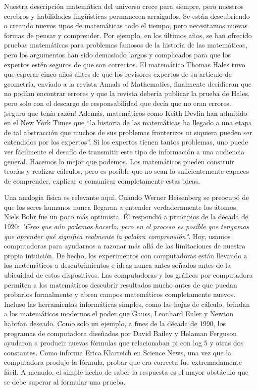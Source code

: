 \documentclass{article}
\begin{document}
Nuestra descripción matemática del universo crece para siempre, pero nuestros
cerebros y habilidades lingüísticas permanecen arraigados. Se están descubriendo
o creando nuevos tipos de matemáticas todo el tiempo, pero necesitamos nuevas
formas de pensar y comprender. Por ejemplo, en los últimos años, se han ofrecido
pruebas matemáticas para problemas famosos de la historia de las matemáticas,
pero los argumentos han sido demasiado largos y complicados para que los
expertos estén seguros de que son correctos. El matemático Thomas Hales tuvo que
esperar cinco años antes de que los revisores expertos de su artículo de
geometría, enviado a la revista Annals of Mathematics, finalmente decidieran que
no podían encontrar errores y que la revista debería publicar la prueba de
Hales, pero solo con el descargo de responsabilidad que decía que no eran
errores. ¡seguro que tenía razón! Además, matemáticos como Keith Devlin han
admitido en el New York Times que “la historia de las matemáticas ha llegado a
una etapa de tal abstracción que muchos de sus problemas fronterizos ni siquiera
pueden ser entendidos por los expertos”. Si los expertos tienen tantos
problemas, uno puede ver fácilmente el desafío de transmitir este tipo de
información a una audiencia general. Hacemos lo mejor que podemos. Los
matemáticos pueden construir teorías y realizar cálculos, pero es posible que no
sean lo suficientemente capaces de comprender, explicar o comunicar
completamente estas ideas.

Una analogía física es relevante aquí. Cuando Werner Heisenberg se preocupó de
que los seres humanos nunca llegaran a entender verdaderamente los átomos, Niels
Bohr fue un poco más optimista. Él respondió a principios de la década de 1920:
\textit{"Creo que aún podemos hacerlo, pero en el proceso es posible que tengamos que
aprender qué significa realmente la palabra comprensión"}. Hoy, usamos
computadoras para ayudarnos a razonar más allá de las limitaciones de nuestra
propia intuición. De hecho, los experimentos con computadoras están llevando a
los matemáticos a descubrimientos e ideas nunca antes soñados antes de la
ubicuidad de estos dispositivos. Las computadoras y los gráficos por computadora
permiten a los matemáticos descubrir resultados mucho antes de que puedan
probarlos formalmente y abren campos matemáticos completamente nuevos. Incluso
las herramientas informáticas simples, como las hojas de cálculo, brindan a los
matemáticos modernos el poder que Gauss, Leonhard Euler y Newton habrían
deseado. Como solo un ejemplo, a fines de la década de 1990, los programas de
computadora diseñados por David Bailey y Helaman Ferguson ayudaron a producir
nuevas fórmulas que relacionaban pi con log 5 y otras dos constantes. Como
informa Erica Klarreich en Science News, una vez que la computadora produjo la
fórmula, probar que era correcta fue extremadamente fácil. A menudo, el simple
hecho de saber la respuesta es el mayor obstáculo que se debe superar al
formular una prueba.
\end{document}

